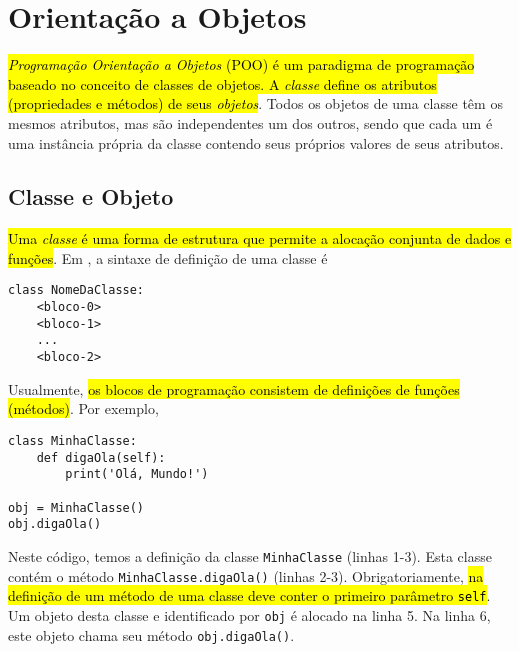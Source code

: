 
\chapter{Orientação a Objetos}\label{cap_poo}

\hl{\emph{Programação Orientação a Objetos} (POO) é um paradigma de programação baseado no conceito de classes de objetos. A \emph{classe} define os atributos (propriedades e métodos) de seus \emph{objetos}}. Todos os objetos de uma classe têm os mesmos atributos, mas são independentes um dos outros, sendo que cada um é uma instância própria da classe contendo seus próprios valores de seus atributos.

\section{Classe e Objeto}\label{cap_ob_sec_class}

\hl{Uma \emph{classe} é uma forma de estrutura que permite a alocação conjunta de dados e funções}. Em {\python}, a sintaxe de definição de uma classe é

\begin{lstlisting}
class NomeDaClasse:
    <bloco-0>
    <bloco-1>
    ...
    <bloco-2>
\end{lstlisting}

Usualmente, \hl{os blocos de programação consistem de definições de funções (métodos)}. Por exemplo,

\begin{lstlisting}
class MinhaClasse:
    def digaOla(self):
        print('Olá, Mundo!')

obj = MinhaClasse()
obj.digaOla()
\end{lstlisting}

Neste código, temos a definição da classe \lstinline+MinhaClasse+ (linhas 1-3). Esta classe contém o método \lstinline+MinhaClasse.digaOla()+ (linhas 2-3). Obrigatoriamente, \hl{na definição de um método de uma classe deve conter o primeiro parâmetro \texttt{self}}. Um objeto desta classe e identificado por \lstinline+obj+ é alocado na linha 5. Na linha 6, este objeto chama seu método \lstinline+obj.digaOla()+.

